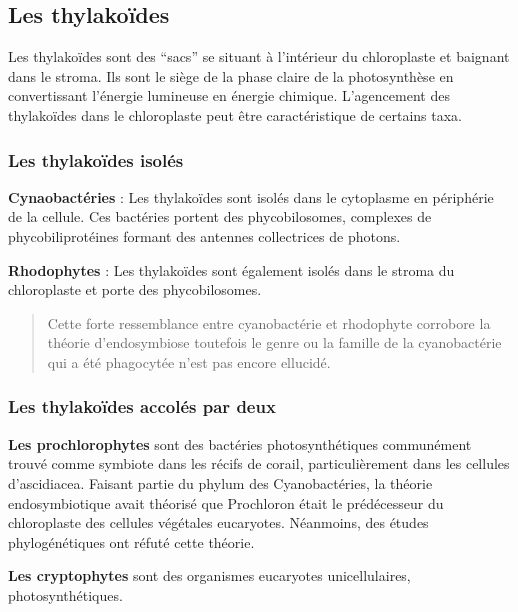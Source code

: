 \documentclass[
]{book}
\begin{document}
\hypertarget{les-thylakouxefdes}{%
\subsection{Les thylakoïdes}\label{les-thylakouxefdes}}

Les thylakoïdes sont des ``sacs'' se situant à l'intérieur du chloroplaste et baignant dans le stroma. Ils sont le siège de la phase claire de la photosynthèse en convertissant l'énergie lumineuse en énergie chimique. L'agencement des thylakoïdes dans le chloroplaste peut être caractéristique de certains taxa.

\hypertarget{les-thylakouxefdes-isoluxe9s}{%
\subsubsection{Les thylakoïdes isolés}\label{les-thylakouxefdes-isoluxe9s}}

\textbf{Cynaobactéries} : Les thylakoïdes sont isolés dans le cytoplasme en périphérie de la cellule. Ces bactéries portent des phycobilosomes, complexes de phycobiliprotéines formant des antennes collectrices de photons.

\textbf{Rhodophytes} : Les thylakoïdes sont également isolés dans le stroma du chloroplaste et porte des phycobilosomes.

\begin{quote}
Cette forte ressemblance entre cyanobactérie et rhodophyte corrobore la théorie d'endosymbiose toutefois le genre ou la famille de la cyanobactérie qui a été phagocytée n'est pas encore ellucidé.
\end{quote}

\hypertarget{les-thylakouxefdes-accoluxe9s-par-deux}{%
\subsubsection{Les thylakoïdes accolés par deux}\label{les-thylakouxefdes-accoluxe9s-par-deux}}

\textbf{Les prochlorophytes} sont des bactéries photosynthétiques communément trouvé comme symbiote dans les récifs de corail, particulièrement dans les cellules d'ascidiacea. Faisant partie du phylum des Cyanobactéries, la théorie endosymbiotique avait théorisé que Prochloron était le prédécesseur du chloroplaste des cellules végétales eucaryotes. Néanmoins, des études phylogénétiques ont réfuté cette théorie.

\textbf{Les cryptophytes} sont des organismes eucaryotes unicellulaires, photosynthétiques.
\end{document}
